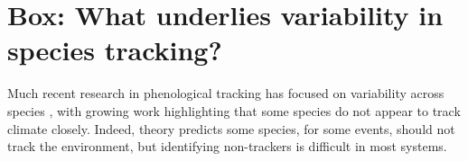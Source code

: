 \documentclass[11pt,letterpaper]{article}
\begin{document}

\section{Box: What underlies variability in species tracking?}
Much recent research in phenological tracking has focused on variability across species \citep[e.g.,][]{Willis:2008bf,Cook:2012pnas,bolmgren2013,CaraDonna2014,Zettlemoyer2019}, with growing work highlighting that some species do not appear to track climate closely. Indeed, theory predicts some species, for some events, should not track the environment, but identifying non-trackers is difficult in most systems. %
\end{document}
